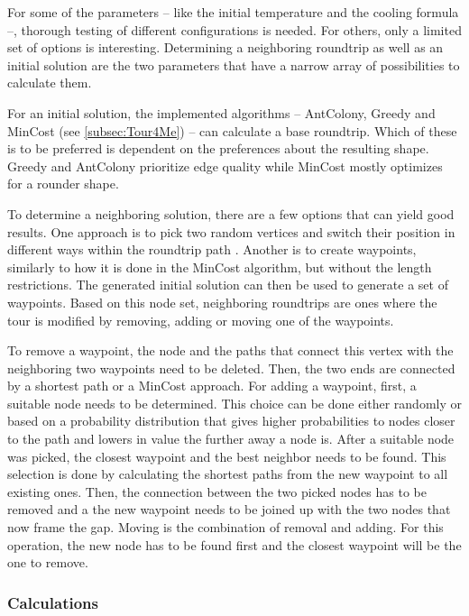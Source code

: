For some of the parameters -- like the initial temperature and the cooling formula --, thorough testing of different configurations is needed.
For others, only a limited set of options is interesting.
Determining a neighboring roundtrip as well as an initial solution are the two parameters that have a narrow array of possibilities to calculate them.

For an initial solution, the implemented algorithms -- AntColony, Greedy and MinCost (see \ref{subsec:Tour4Me}) -- can calculate a base roundtrip.
Which of these is to be preferred is dependent on the preferences about the resulting shape. 
Greedy and AntColony prioritize edge quality while MinCost mostly optimizes for a rounder shape.

To determine a neighboring solution, there are a few options that can yield good results.
One approach is to pick two random vertices and switch their position in different ways within the roundtrip path \cite{zhan_list-based_2016}. 
Another is to create waypoints, similarly to how it is done in the MinCost algorithm, but without the length restrictions.
The generated initial solution can then be used to generate a set of waypoints. 
Based on this node set, neighboring roundtrips are ones where the tour is modified by removing, adding or moving one of the waypoints.

To remove a waypoint, the node and the paths that connect this vertex with the neighboring two waypoints need to be deleted. 
Then, the two ends are connected by a shortest path or a MinCost approach.
For adding a waypoint, first, a suitable node needs to be determined. 
This choice can be done either randomly or based on a probability distribution that gives higher probabilities to nodes closer to the path and lowers in value the further away a node is.
After a suitable node was picked, the closest waypoint and the best neighbor needs to be found.
This selection is done by calculating the shortest paths from the new waypoint to all existing ones.
Then, the connection between the two picked nodes has to be removed and a the new waypoint needs to be joined up with the two nodes that now frame the gap. 
Moving is the combination of removal and adding.
For this operation, the new node has to be found first and the closest waypoint will be the one to remove.




\subsubsection{Calculations}
\label{subsubsec:SACalculations}

